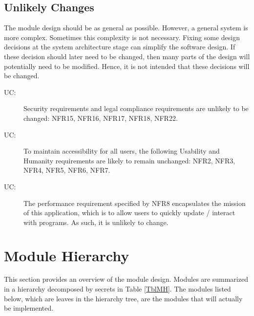 \documentclass[12pt, titlepage]{article}
\newcounter{ucnum}
\newcommand{\uctheucnum}{UC\theucnum}
\begin{document}
\subsection{Unlikely Changes} \label{SecUchange}

The module design should be as general as possible. However, a general system is
more complex. Sometimes this complexity is not necessary. Fixing some design
decisions at the system architecture stage can simplify the software design. If
these decision should later need to be changed, then many parts of the design
will potentially need to be modified. Hence, it is not intended that these
decisions will be changed.

\begin{description}
\item[ \uctheucnum \label{ucLegal}:] Security requirements and legal compliance requirements are unlikely to be changed: NFR15, NFR16, NFR17, NFR18, NFR22.
\item[ \uctheucnum \label{ucUsability}:] To maintain accessibility for all users, the following Usability and Humanity requirements are likely to remain unchanged: NFR2, NFR3, NFR4, NFR5, NFR6, NFR7.
\item[ \uctheucnum \label{ucPerformance}:] The performance requirement specified by NFR8 encapsulates the mission of this application, which is to allow users to quickly update / interact with programs. As such, it is unlikely to change.
\end{description}

\section{Module Hierarchy} \label{SecMH}

This section provides an overview of the module design. Modules are summarized
in a hierarchy decomposed by secrets in Table \ref{TblMH}. The modules listed
below, which are leaves in the hierarchy tree, are the modules that will
actually be implemented.
\end{document}
